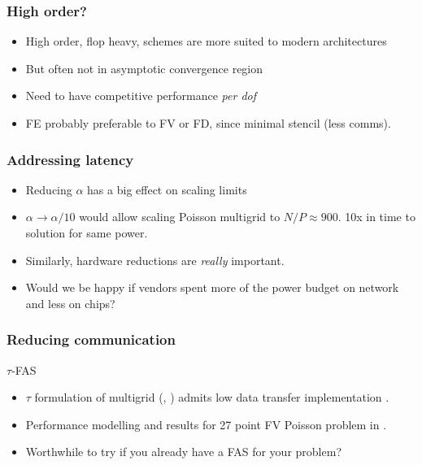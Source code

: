 \documentclass[presentation]{beamer}
\begin{document}
\begin{frame}
  \frametitle{High order?}
  \begin{itemize}
  \item High order, flop heavy, schemes are more suited to modern
    architectures
  \item But often not in asymptotic convergence region
  \item Need to have competitive performance \emph{per dof}
  \item FE probably preferable to FV or FD, since minimal stencil (less comms).
  \end{itemize}
\end{frame}
\begin{frame}
  \frametitle{Addressing latency}

  \begin{itemize}
  \item Reducing $\alpha$ has a big effect on scaling limits
  \item $\alpha \rightarrow \alpha/10$ would allow scaling Poisson
    multigrid to $N/P\approx 900$.  \alert{10x} in time to solution
    for same power.
  \item Similarly, hardware reductions are \emph{really} important.
  \item Would we be happy if vendors spent more of the power budget on
    network and less on chips?
  \end{itemize}
\end{frame}

\begin{frame}
  \frametitle{Reducing communication}

  \begin{block}{$\tau$-FAS}
    \begin{itemize}
    \item $\tau$ formulation of multigrid (\textcite{Brandt:1977},
      \textcite[\S 8.3]{Brandt:2011}) admits low data transfer
      implementation \parencite{Brandt:1994}.

    \item Performance modelling and results for 27 point FV Poisson
      problem in \textcite{Adams:2016}.

    \item Worthwhile to try if you already have a FAS for your problem?
    \end{itemize}
  \end{block}
\end{frame}
\end{document}
